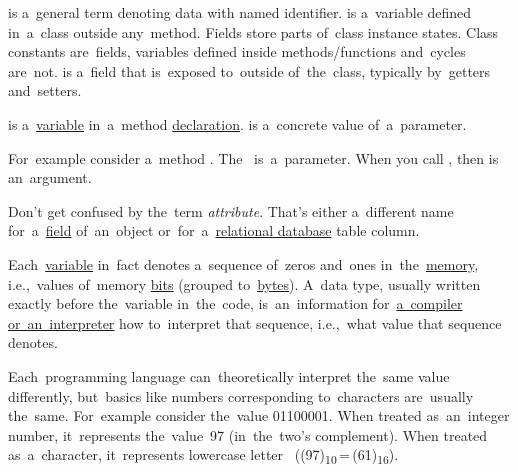 \label{variablefieldproperty}
\begin{itemize}
     is a~general term denoting data with named identifier.
     is a~variable defined in~a~class outside any~method.
            Fields store parts of~class instance states.
            Class constants are~fields, variables defined inside \mbox{methods/functions} and~cycles are~not.
     is a~field that is~exposed to~outside of~the~class, typically by~getters and~setters.
\end{itemize}

\label{parameterargument}
\begin{itemize}
     is a~\hyperref[variablefieldproperty]{variable} in~a~method \hyperref[declarationdefinition]{declaration}.
     is a~concrete value of~a~parameter.
\end{itemize}
For~example consider a~method .
The~ is~a~parameter.
When you call , then  is an~argument.

\warning Don't get confused by the~term \textit{attribute}.
That's either a~different name for~a~\hyperref[variablefieldproperty]{field} of~an~object or~for~a~\hyperref[relationaldatabase]{relational database} table column.

\label{datatypes}
Each~\hyperref[variablefieldproperty]{variable} in~fact denotes a~sequence of~zeros and~ones in~the~\hyperref[systemmemory]{memory}, i.e.,~values of~memory \hyperref[bitsandbytes]{bits} (grouped to~\hyperref[bitsandbytes]{bytes}).
A~data type, usually written exactly before the~variable in~the~code, is~an~information for~\hyperref[compiledinterpretedlanguages]{a~compiler or~an~interpreter} how to~interpret that sequence, i.e.,~what value that sequence denotes.

Each~programming language can~theoretically interpret the~same value differently, but~basics like numbers corresponding to~characters are~usually the~same.
For~example consider the~value 01100001.
When treated as~an~integer number, it~represents the~value~97 (in~the~two's complement).
When treated as~a~character, it~represents lowercase letter~ \mbox{((97)\textsubscript{10}\,=\,(61)\textsubscript{16})}.

